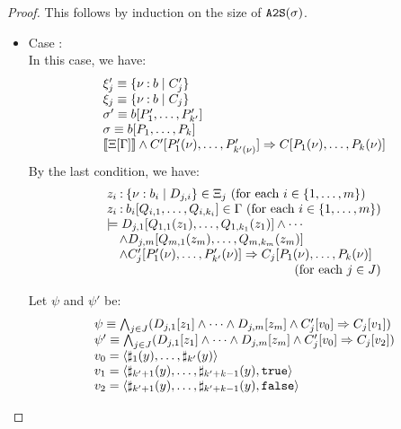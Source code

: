 \begin{proof}
This follows by induction on the size of \(\mathtt{A2S}(\sigma)\).

\begin{itemize}
\item Case :\\
In this case, we have:
\[
\begin{array}{l}
\xi_j' \equiv \rtbase{\nu}{b}{C_j'}\\
\xi_j \equiv  \rtbase{\nu}{b}{C_j}\\
\sigma' \equiv b[P'_1,\ldots,P'_{k'}]\\
\sigma \equiv b[P_1,\ldots,P_k]\\
\SEM{\comp{\Xi}{\Gamma}}\land C'[P'_1(\nu),\ldots,P'_{k'(\nu)}] \imply C[P_1(\nu),\ldots,P_k(\nu)]
\end{array}
\]
By the last condition, we have:
\[
\begin{array}{l}
z_i \COL \set{\nu:b_i \mid D_{j,i}}\in \Xi_j \mbox{ (for each $i\in \set{1,\ldots,m}$)}\\
z_i \COL  b_i[Q_{i,1},\ldots,Q_{i,k_i}] \in \Gamma \mbox{ (for each $i\in \set{1,\ldots,m}$)}\\
\models D_{j,1}[Q_{1,1}(z_1),\ldots,Q_{1,k_1}(z_1)]\land \cdots\\
\quad\land D_{j,m}[Q_{m,1}(z_m),\ldots,Q_{m,k_m}(z_m)]\\
\quad\land C_j'[P'_1(\nu),\ldots,P'_{k'}(\nu)] \imply  C_j[P_1(\nu),\ldots,P_k(\nu)]\\
\qquad\qquad \hfill\mbox{ (for each $j\in J$)}
\end{array}
\]

Let \(\psi\) and \(\psi'\) be:
\[
\begin{array}{l}
\psi \equiv 
  \bigwedge_{j\in J}(D_{j,1}[z_1]\land \cdots\land D_{j,m}[z_m]\land C_j'[v_0]\Rightarrow C_j[v_1])\\
\psi' \equiv 
 \bigwedge_{j\in J}( D_{j,1}[z_1]\land \cdots\land D_{j,m}[z_m] \land C_j'[v_0]\Rightarrow C_j[v_2])\\
v_0 = \langle{\sharp_{1}(y),\ldots,\sharp_{k'}(y)}\rangle\\
v_1 = \langle{\sharp_{k'+1}(y),\ldots,\sharp_{k'+k-1}(y),\mathtt{true}}\rangle\\
v_2 = \langle{\sharp_{k'+1}(y),\ldots,\sharp_{k'+k-1}(y),\mathtt{false}}\rangle\\
\end{array}
\]


\end{itemize}
\end{proof}
